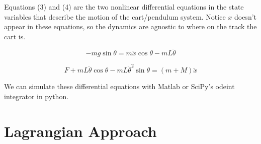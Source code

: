 \documentclass{article}
\begin{document}
Equations (3) and (4) are the two nonlinear differential equations in the state variables that describe the motion of the cart/pendulum system. Notice $x$ doesn't appear in these equations, so the dynamics are agnostic to where on the track the cart is.

\[
\boxed{-mg\sin{\theta} = m\ddot{x}\cos{\theta} - mL\ddot{\theta}}
\]

\[
\boxed{ F + mL\ddot{\theta}\cos{\theta} - mL\dot{\theta}^{2}\sin{\theta} = (m + M)\ddot{x}}
\]

We can simulate these differential equations with Matlab or SciPy's odeint integrator in python.

\section*{Lagrangian Approach}
\end{document}

